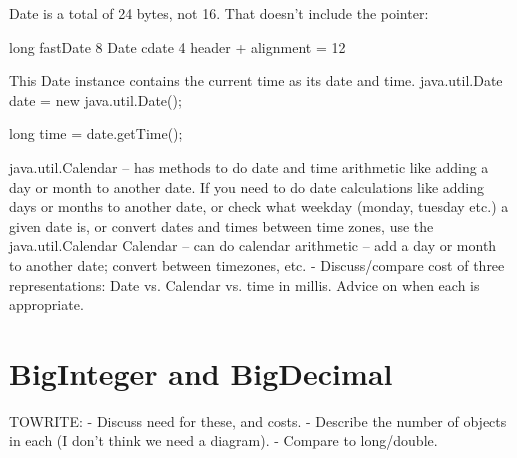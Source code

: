 Date is a total of 24 bytes, not 16.  That doesn't include the pointer:

long fastDate    8
Date cdate  4
header + alignment = 12 

This Date instance contains the current time as its date and time.
java.util.Date date = new java.util.Date();

long time = date.getTime(); 

java.util.Calendar -- has methods to do date and time arithmetic like adding a
day or
month to another date.
If you need to do date calculations like adding days or months to another date,
or check what weekday (monday, tuesday etc.) a given date is, or convert dates and times between time zones, use the java.util.Calendar Calendar -- can do calendar arithmetic -- add a day or
month to another date; convert between timezones, etc. - Discuss/compare cost of three representations:
Date vs. Calendar vs. time in millis.  Advice on when each is appropriate.

\section{BigInteger and BigDecimal}
TOWRITE:
- Discuss need for these, and costs.  - Describe the number of objects in each
(I don't think we need a diagram). - Compare to long/double.
